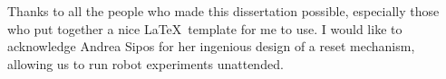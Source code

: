 Thanks to all the people who made this dissertation possible, especially those who put together a nice \LaTeX\, template for me to use. I would like to acknowledge Andrea Sipos for her ingenious design of a reset mechanism, allowing us to run robot experiments unattended.
